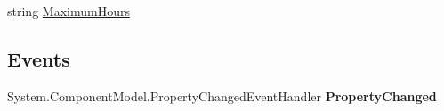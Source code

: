 \begin{DoxyCompactItemize}
\begin{DoxyCompactList}\small\item\em \end{DoxyCompactList}\item 
\hypertarget{class_price___comparison_1_1amazon_1_1ecs_1_1_offer_listing_availability_attributes_a4e3c9d2a82296952262503b1f44cca3f}{string \hyperlink{class_price___comparison_1_1amazon_1_1ecs_1_1_offer_listing_availability_attributes_a4e3c9d2a82296952262503b1f44cca3f}{Maximum\-Hours}}\label{class_price___comparison_1_1amazon_1_1ecs_1_1_offer_listing_availability_attributes_a4e3c9d2a82296952262503b1f44cca3f}

\begin{DoxyCompactList}\small\item\em \end{DoxyCompactList}\end{DoxyCompactItemize}
\subsection*{Events}
\begin{DoxyCompactItemize}
\item 
\hypertarget{class_price___comparison_1_1amazon_1_1ecs_1_1_offer_listing_availability_attributes_a797bc00b4426cfd09c5278cb77169422}{System.\-Component\-Model.\-Property\-Changed\-Event\-Handler {\bfseries Property\-Changed}}\label{class_price___comparison_1_1amazon_1_1ecs_1_1_offer_listing_availability_attributes_a797bc00b4426cfd09c5278cb77169422}

\end{DoxyCompactItemize}
